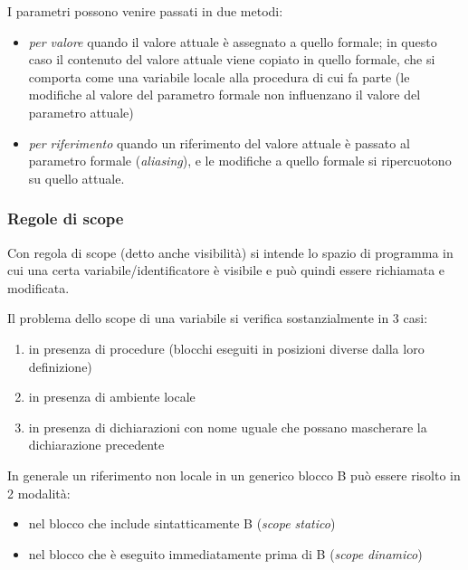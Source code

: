 \documentclass[a4paper, 10pt]{article}
\begin{document}
	I parametri possono venire passati in due metodi:
	\begin{itemize}
		\item \textit{per valore} quando il valore attuale è assegnato a quello formale; in questo caso il contenuto del valore attuale viene copiato in quello formale, che si comporta come una variabile locale alla procedura di cui fa parte (le modifiche al valore del parametro formale non influenzano il valore del parametro attuale)
		
		\item \textit{per riferimento} quando un riferimento del valore attuale è passato al parametro formale (\textit{aliasing}), e le modifiche a quello formale si ripercuotono su quello attuale.
	\end{itemize}
	
	\subsubsection{Regole di scope}
	Con regola di scope (detto anche visibilità) si intende lo spazio di programma in cui una certa variabile/identificatore è visibile e può quindi essere richiamata e modificata.
	
	Il problema dello scope di una variabile si verifica sostanzialmente in 3 casi:
	\begin{enumerate}
		\item in presenza di procedure (blocchi eseguiti in posizioni diverse dalla loro definizione)
		\item in presenza di ambiente locale
		\item in presenza di dichiarazioni con nome uguale che possano mascherare la dichiarazione precedente
	\end{enumerate}
	
	In generale un riferimento non locale in un generico blocco B può essere risolto in 2 modalità:
	\begin{itemize}
		\item nel blocco che include sintatticamente B (\textit{scope statico})
		\item nel blocco che è eseguito immediatamente prima di B (\textit{scope dinamico})
	\end{itemize}
	
\end{document}
